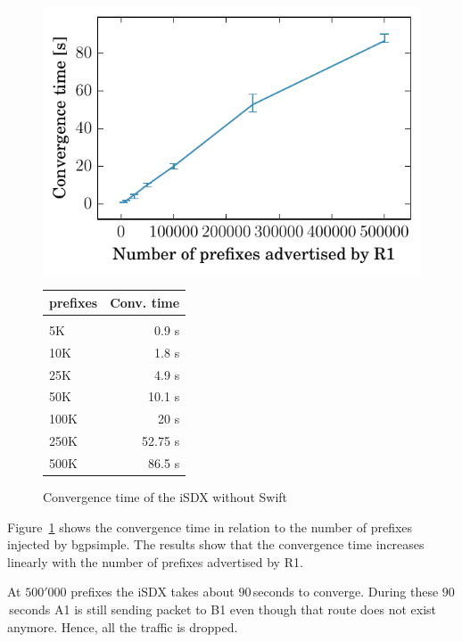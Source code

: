 \begin{figure}
\centering
\begin{minipage}[t]{.4\textwidth}
\centering
\vspace{0pt}
\includegraphics[scale = 1]{Figures/noswift.pdf}
\end{minipage}\hfill
\begin{minipage}[t]{.4\textwidth}
\centering
\vspace{0pt}
\begin{tabular}{@{}lr@{}}
	\\
	prefixes & Conv. time \\
	\hline
	\\
    5K & 0.9 s  \\
    10K & 1.8 s   \\
    25K & 4.9 s   \\
    50K & 10.1 s  \\
    100K & 20 s \\
    250K & 52.75 s   \\
    500K & 86.5 s  \\
\end{tabular}
\end{minipage}
\caption{Convergence time of the iSDX without Swift}
\label{fig:noswift}
\end{figure}

Figure~\ref{fig:noswift} shows the convergence time in relation to the number of prefixes injected by bgpsimple. The results show that the convergence time increases linearly with the number of prefixes advertised by R1.

At $500'000$ prefixes the iSDX takes about $90$\,seconds to converge. During these $90$\,seconds A1 is still sending packet to B1 even though that route does not exist anymore. Hence, all the traffic is dropped. 

